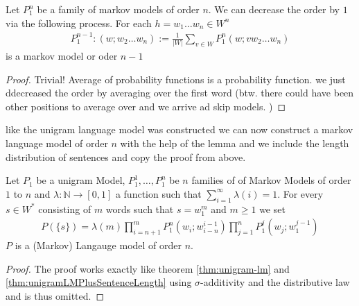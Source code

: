 \documentclass[•]{book}
\begin{document}
\begin{lemma}\label{lem:constructLowerOrderMarkovFamilies}
Let $P_1^n$ be a family of markov models  of order $n$. We can decrease the order by $1$ via the following process. 
For each $h=w_1\dots w_n\in W^n$ 
\begin{align}
P_1^{n-1}:(w;w_2\dots w_n):=\frac{1}{|W|}\sum_{v\in W}P_1^n(w;v w_2\dots w_n)
\end{align}
is a markov model or oder $n-1$ 
\begin{proof}
Trivial!  Average of probability functions is a probability function. we just ddecreased the order by averaging over the first word (btw. there could have been other positions to average over and we arrive ad skip models. )
\end{proof}
\end{lemma}

like the unigram language model was constructed we can now construct a markov language model of order $n$ with the help of the lemma and we include the length distribution of sentences and copy the proof from above. 
\begin{theorem}\label{thm:markovModelOrderN}
Let $P_1$ be a unigram Model, $P_1^1,\dots,P_1^n$ be $n$ families of of Markov Models of order $1$ to $n$ and $\lambda:\mathbb{N}\longrightarrow [0,1]$ a function such that $\sum_{i=1}^\infty\lambda(i) = 1$. For every $s\in W^{*}$ consisting of $m$ words such that $s=w_1^m$  and $m\geq 1$ we set
\begin{align}
P(\{s\})=\lambda(m)\prod_{i=n+1}^mP_1^n(w_i;w_{i-n}^{i-1})\prod_{j=1}^nP_1^{j}(w_j;w_1^{j-1})\label{formula:MarkovLMOrderN}
\end{align}
$P$ is a (Markov) Langauge model of order $n$.
\begin{proof}
The proof works exactly like theorem \ref{thm:unigram-lm} and \ref{thm:unigramLMPlusSentenceLength} using $\sigma$-additivity and the distributive law and is thus omitted. 
\end{proof}
\end{theorem}
\end{document}
